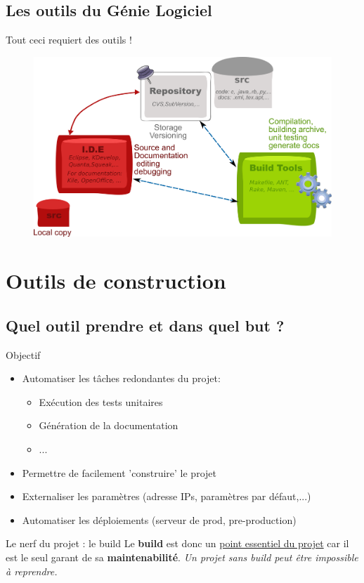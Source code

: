 \documentclass[handout]{beamer}
\begin{document}
\subsection{Les outils du Génie Logiciel}
\begin{frame}
 	\begin{block}{Tout ceci requiert des outils !}
 	\end{block}
	\begin{figure}[hbtp]
		\includegraphics[scale=0.5]{../img/project-tools.png}
	\end{figure}
\end{frame}

\section{Outils de construction}
\subsection{Quel outil prendre et dans quel but ?}
\begin{frame}
 	\begin{block}{Objectif}
		\begin{itemize}
			\item Automatiser les tâches redondantes du projet:
				\begin{itemize}
					\item Exécution des tests unitaires
					\item Génération de la documentation
					\item ...
				\end{itemize}
			\item Permettre de facilement 'construire' le projet
			\item Externaliser les paramètres (adresse IPs, paramètres par défaut,...)
			\item Automatiser les déploiements (serveur de prod, pre-production)	
		\end{itemize}
	\end{block}
	\begin{block}{Le nerf du projet : le build}
	 	Le \textbf{build} est donc un \underline{point essentiel du projet} car
		il est le seul garant de sa \textbf{maintenabilité}.
		\textit{Un projet sans build peut être impossible à reprendre.}
	\end{block}
\end{frame}
\end{document}
